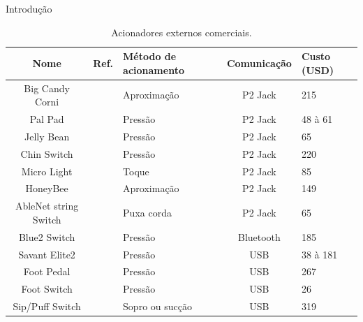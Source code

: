 \begin{chapter}{Introdução}
\begin{table}[!h]
\centering
\caption{Acionadores externos comerciais.}
\label{tab:acionadores}
\def\arraystretch{1.25}
\begin{tabular}{ccp{3cm}cp{3cm}}
	\hline
	\hline
	\textbf{Nome} & \textbf{Ref.} & \textbf{Método de acionamento} & \textbf{Comunicação} & \textbf{Custo (USD)} \\
	\hline
	Big Candy Corni        &~\cite{CandyCorn}        & Aproximação     & P2 Jack      & 215              \\
	Pal Pad                &~\cite{PalPad}           & Pressão         & P2 Jack      &  48 à 61         \\
	Jelly Bean             &~\cite{JellyBean}        & Pressão         & P2 Jack      &   65             \\
	Chin Switch            &~\cite{Chin}             & Pressão         & P2 Jack      & 220              \\
	Micro Light            &~\cite{MicroLight}       & Toque           & P2 Jack      & 85               \\ 
	HoneyBee               &~\cite{HoneyBee}         & Aproximação     & P2 Jack      & 149              \\
	AbleNet string Switch  &~\cite{StringSwitch}     & Puxa corda      & P2 Jack      & 65               \\
	Blue2 Switch           &~\cite{Blue2}            & Pressão         & Bluetooth    & 185              \\
	Savant Elite2          &~\cite{SavantElite2}     & Pressão         & USB          & 38 à 181         \\
	Foot Pedal             &~\cite{FootPedal}        & Pressão         & USB          & 267              \\
	Foot Switch            &~\cite{FootSwitch}       & Pressão         & USB          & 26               \\
	Sip/Puff Switch        &~\cite{SipPuff}          & Sopro ou sucção & USB          & 319              \\  
	
	\hline
	\hline
\end{tabular}
\end{table}


\end{chapter}
